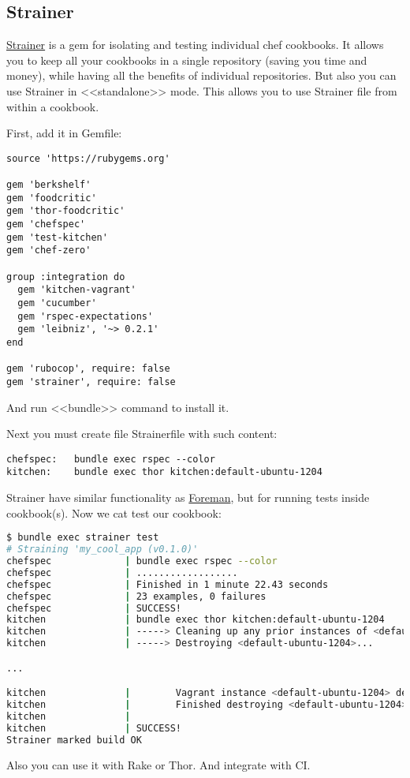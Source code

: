 \subsection{Strainer}

\href{https://github.com/customink/strainer}{Strainer} is a gem for isolating and testing individual chef cookbooks. It allows you to keep all your cookbooks in a single repository (saving you time and money), while having all the benefits of individual repositories. But also you can use Strainer in <<standalone>> mode. This allows you to use Strainer file from within a cookbook.

First, add it in Gemfile:

\begin{lstlisting}[label=lst:testing-strainer1]
source 'https://rubygems.org'

gem 'berkshelf'
gem 'foodcritic'
gem 'thor-foodcritic'
gem 'chefspec'
gem 'test-kitchen'
gem 'chef-zero'

group :integration do
  gem 'kitchen-vagrant'
  gem 'cucumber'
  gem 'rspec-expectations'
  gem 'leibniz', '~> 0.2.1'
end

gem 'rubocop', require: false
gem 'strainer', require: false
\end{lstlisting}

And run <<bundle>> command to install it.

Next you must create file Strainerfile with such content:

\begin{lstlisting}[label=lst:testing-strainer2]
chefspec:   bundle exec rspec --color
kitchen:    bundle exec thor kitchen:default-ubuntu-1204
\end{lstlisting}

Strainer have similar functionality as \href{http://ddollar.github.io/foreman/}{Foreman}, but for running tests inside cookbook(s). Now we cat test our cookbook:

\begin{lstlisting}[language=Bash,label=lst:testing-strainer3]
$ bundle exec strainer test
# Straining 'my_cool_app (v0.1.0)'
chefspec             | bundle exec rspec --color
chefspec             | ..................
chefspec             | Finished in 1 minute 22.43 seconds
chefspec             | 23 examples, 0 failures
chefspec             | SUCCESS!
kitchen              | bundle exec thor kitchen:default-ubuntu-1204
kitchen              | -----> Cleaning up any prior instances of <default-ubuntu-1204>
kitchen              | -----> Destroying <default-ubuntu-1204>...

...

kitchen              |        Vagrant instance <default-ubuntu-1204> destroyed.
kitchen              |        Finished destroying <default-ubuntu-1204> (0m6.87s).
kitchen              |
kitchen              | SUCCESS!
Strainer marked build OK
\end{lstlisting}

Also you can use it with Rake or Thor. And integrate with CI.